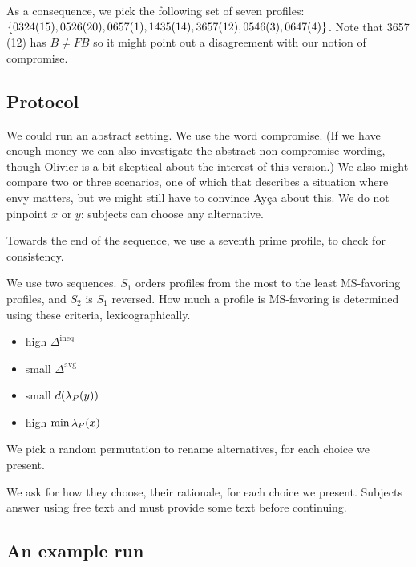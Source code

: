 \documentclass[pagesize, twoside=off, bibliography=totoc, DIV=calc, fontsize=12pt, a4paper]{scrartcl}
\begin{document}
As a consequence, we pick the following set of seven profiles: $\{0324 (15), 0526 (20), 0657 (1), \allowbreak 1435 (14), \allowbreak 3657 (12), \allowbreak 0546 (3), 0647 (4)\}$.
Note that 3657 (12) has $B ≠ FB$ so it might point out a disagreement with our notion of compromise.

\subsection{Protocol}
We could run an abstract setting. We use the word compromise. (If we have enough money we can also investigate the abstract-non-compromise wording, though Olivier is a bit skeptical about the interest of this version.)
We also might compare two or three scenarios, one of which that describes a situation where envy matters, but we might still have to convince Ayça about this.
We do not pinpoint $x$ or $y$: subjects can choose any alternative.

Towards the end of the sequence, we use a seventh prime profile, to check for consistency.

We use two sequences. $S_1$ orders profiles from the most to the least MS-favoring profiles, and $S_2$ is $S_1$ reversed. How much a profile is MS-favoring is determined using these criteria, lexicographically.
\begin{itemize}
	\item high $\Delta^\text{ineq}$
	\item small $\Delta^\text{avg}$
	\item small $d(\lambda_P(y))$
	\item high $\min \lambda_P(x)$
\end{itemize}

We pick a random permutation to rename alternatives, for each choice we present.

We ask for how they choose, their rationale, for each choice we present. Subjects answer using free text and must provide some text before continuing.

\subsection{An example run}



\end{document}
